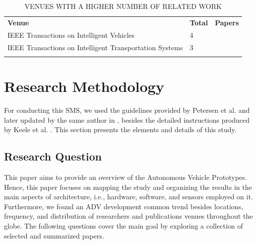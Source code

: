 \documentclass[lettersize,journal]{IEEEtran}
\begin{document}
\begin{table}[!ht]
  \centering
  \captionsetup{
    format=hang, %
    justification=raggedright,
    singlelinecheck=false,
    skip=9pt, %
  }
  \caption{\MakeUppercase{Venues with a higher number of related work}}
  \label{table:venueRelatedWorks}
  \def\arraystretch{1.5} 
  \begin{tabularx}{\textwidth}{X>{\centering\arraybackslash}m{0.7cm}>{\centering\arraybackslash}m{2.8cm}}
    \arrayrulecolor{white}
    \rowcolor{white}
    \textbf{Venue} & \textbf{Total} & \textbf{Papers} \\
    \arrayrulecolor{cor_tabela} \hline
    IEEE Transactions on Intelligent Vehicles & \cellcolor{cor_tabela}4 & \cellcolor{cor_tabela}\cite{Bresson2017,Paden2016,Bevly2016,Barnett2020} \\
    \arrayrulecolor{cor_tabela} \hline
    IEEE Transactions on Intelligent Transportation Systems & \cellcolor{cor_tabela}3 & \cellcolor{cor_tabela}\cite{Mozaffari2020,Aradi2020,ElKhatib2020} \\
    \arrayrulecolor{cor_tabela} \hline
  \end{tabularx}
\end{table}

\section{Research Methodology}\label{metodo}


For conducting this SMS, we used the guidelines provided by Petersen et al. \cite{petersen2008systematic} and later updated by the same author in \cite{petersen2015guidelines}, besides the detailed instructions produced by Keele et al. \cite{keele2007guidelines}. This section presents the elements and details of this study.


\subsection{Research Question}


This paper aims to provide an overview of the Autonomous Vehicle Prototypes. Hence, this paper focuses on mapping the study and organizing the results in the main aspects of architecture, i.e., hardware, software, and sensors employed on it. Furthermore, we found an ADV development common trend besides locations, frequency, and distribution of researchers and publications venues throughout the globe. The following questions cover the main goal by exploring a collection of selected and summarized papers.\\
\end{document}
